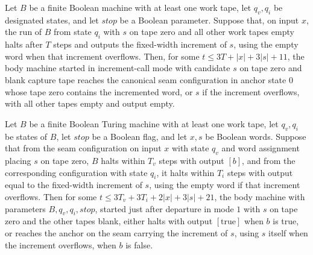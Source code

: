 \begin{lemma}
\label{Complexity.enumCont_body_increment}
\leanok
{}
Let $B$ be a finite Boolean machine with at least one work tape, let $q_v,q_i$ be
designated states, and let $stop$ be a Boolean parameter. Suppose that, on input $x$,
the run of $B$ from state $q_i$ with $s$ on tape zero and all other work tapes empty
halts after $T$ steps and outputs the fixed-width increment of $s$, using the empty word
when that increment overflows. Then, for some $t\le 3T+|x|+3|s|+11$, the body machine
started in increment-call mode with candidate $s$ on tape zero and blank capture tape
reaches the canonical seam configuration in anchor state $0$ whose tape zero contains
the incremented word, or $s$ if the increment overflows, with all other tapes empty and
output empty.
\end{lemma}

\begin{lemma}
\label{Complexity.enumCont_body_round_raw}
\leanok
{}
Let $B$ be a finite Boolean Turing machine with at least one work tape, let $q_v,q_i$ be
states of $B$, let $stop$ be a Boolean flag, and let $x,s$ be Boolean words. Suppose
that from the seam configuration on input $x$ with state $q_v$ and word assignment
placing $s$ on tape zero, $B$ halts within $T_v$ steps with output $[b]$, and from the
corresponding configuration with state $q_i$, it halts within $T_i$ steps with output
equal to the fixed-width increment of $s$, using the empty word if that increment
overflows. Then for some $t\le 3T_v+3T_i+2|x|+3|s|+21$, the body machine with parameters
$B,q_v,q_i,stop$, started just after departure in mode $1$ with $s$ on tape zero and the
other tapes blank, either halts with output $[\mathrm{true}]$ when $b$ is true, or
reaches the anchor on the seam carrying the increment of $s$, using $s$ itself when the
increment overflows, when $b$ is false.
\end{lemma}

